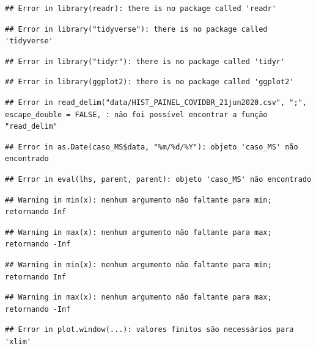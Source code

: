 \documentclass[
]{book}
\begin{document}
\begin{verbatim}
## Error in library(readr): there is no package called 'readr'
\end{verbatim}

\begin{verbatim}
## Error in library("tidyverse"): there is no package called 'tidyverse'
\end{verbatim}

\begin{verbatim}
## Error in library("tidyr"): there is no package called 'tidyr'
\end{verbatim}

\begin{verbatim}
## Error in library(ggplot2): there is no package called 'ggplot2'
\end{verbatim}

\begin{verbatim}
## Error in read_delim("data/HIST_PAINEL_COVIDBR_21jun2020.csv", ";", escape_double = FALSE, : não foi possível encontrar a função "read_delim"
\end{verbatim}

\begin{verbatim}
## Error in as.Date(caso_MS$data, "%m/%d/%Y"): objeto 'caso_MS' não encontrado
\end{verbatim}

\begin{verbatim}
## Error in eval(lhs, parent, parent): objeto 'caso_MS' não encontrado
\end{verbatim}

\begin{verbatim}
## Warning in min(x): nenhum argumento não faltante para min; retornando Inf
\end{verbatim}

\begin{verbatim}
## Warning in max(x): nenhum argumento não faltante para max; retornando -Inf
\end{verbatim}

\begin{verbatim}
## Warning in min(x): nenhum argumento não faltante para min; retornando Inf
\end{verbatim}

\begin{verbatim}
## Warning in max(x): nenhum argumento não faltante para max; retornando -Inf
\end{verbatim}

\begin{verbatim}
## Error in plot.window(...): valores finitos são necessários para 'xlim'
\end{verbatim}
\end{document}
